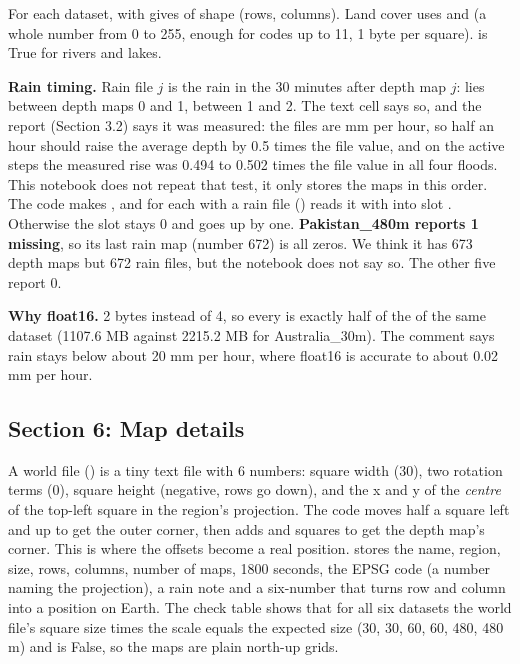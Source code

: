 For each dataset,  with  gives  of shape (rows, columns). Land cover uses  and  (a whole number from 0 to 255, enough for codes up to 11, 1 byte per square).  is True for rivers and lakes.

\textbf{Rain timing.} Rain file $j$ is the rain in the 30 minutes after depth map $j$:  lies between depth maps 0 and 1,  between 1 and 2. The text cell says so, and the report (Section 3.2) says it was measured: the files are mm per hour, so half an hour should raise the average depth by 0.5 times the file value, and on the active steps the measured rise was 0.494 to 0.502 times the file value in all four floods. This notebook does not repeat that test, it only stores the maps in this order. The code makes , and for each  with a rain file () reads it with  into slot . Otherwise the slot stays 0 and  goes up by one. \textbf{Pakistan\_480m reports 1 missing}, so its last rain map (number 672) is all zeros. We think it has 673 depth maps but 672 rain files, but the notebook does not say so. The other five report 0.

\begin{plainbox}
\textbf{Why float16.} 2 bytes instead of 4, so every  is exactly half of the  of the same dataset (1107.6 MB against 2215.2 MB for Australia\_30m). The comment says rain stays below about 20 mm per hour, where float16 is accurate to about 0.02 mm per hour.
\end{plainbox}


\subsection{Section 6: Map details}

A world file () is a tiny text file with 6 numbers: square width (30), two rotation terms (0), square height (negative, rows go down), and the x and y of the \emph{centre} of the top-left square in the region's projection. The code moves half a square left and up to get the outer corner, then adds  and  squares to get the depth map's corner. This is where the offsets become a real position.  stores the name, region, size, rows, columns, number of maps, 1800 seconds, the EPSG code (a number naming the projection), a rain note and a six-number  that turns row and column into a position on Earth. The check table shows that for all six datasets the world file's square size times the scale equals the expected size (30, 30, 60, 60, 480, 480 m) and  is False, so the maps are plain north-up grids.

